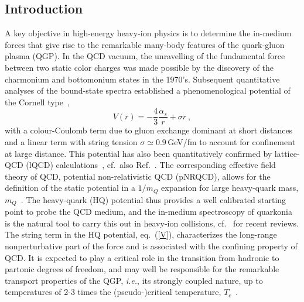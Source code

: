 \documentclass[../report.tex]{subfiles}
\begin{document}
\subsection{Introduction} %
\label{sec_intro}
A key objective in high-energy heavy-ion physics is to determine the in-medium forces that give rise to the remarkable many-body features of the quark-gluon plasma (QGP).
In the QCD vacuum, the unravelling of the fundamental force between two static color charges was made possible by the discovery of the charmonium and bottomonium states in the 1970's. 
Subsequent quantitative analyses of the bound-state spectra established a phenomenological potential of the Cornell type~\cite{Eichten:1979ms}, 
\begin{equation}
V(r) = -\frac{4}{3} \frac{\alpha_s}{r} + \sigma r \ ,
\label{V}
\end{equation} 
with a colour-Coulomb term due to gluon exchange dominant at short distances and a linear term with string tension $\sigma\simeq0.9$\,GeV/fm to account for confinement at large distance. 
This potential has also been quantitatively confirmed by lattice-QCD (lQCD) calculations~\cite{Bali:2000gf}, cf.~also Ref.~\cite{Brambilla:2004jw}. 
The corresponding effective field theory of QCD, potential non-relativistic QCD (pNRQCD), allows for the definition of the static potential in a  $1/m_Q$ expansion for large heavy-quark mass, $m_Q$~\cite{Brambilla:1999xf,Brambilla:2004wf}. 
The heavy-quark (HQ) potential thus provides a well calibrated starting point to probe the QCD medium, and the in-medium spectroscopy of quarkonia is the natural tool to carry this out in heavy-ion collisions, cf.~\cite{Rapp:2008tf,BraunMunzinger:2009ih,Kluberg:2009wc,Mocsy:2013syh,Liu:2015izf} 
for recent reviews.
The string term in the HQ potential, eq.~(\ref{V}), characterizes the long-range nonperturbative part of the force and is associated with the confining property of QCD. It is expected to play a critical role in the transition from hadronic to partonic degrees of freedom, and may well be responsible for the remarkable transport properties of the QGP, {\it i.e.}, its strongly coupled nature, up to temperatures of 2-3 times the (pseudo-)critical temperature, $T_c$~\cite{Liu:2016ysz}. 
\end{document}
